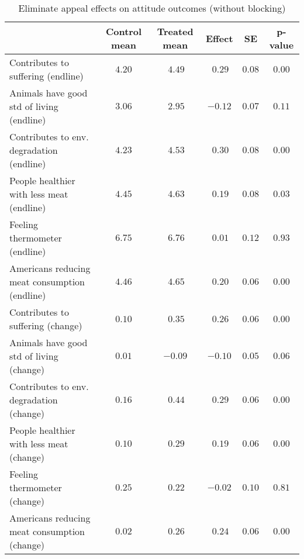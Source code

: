 \begin{table*}[ht]
\caption{Eliminate appeal effects on attitude outcomes (without blocking)\label{round}} 
\begin{center}
\begin{tabular}{lccccc}
\hline\hline
\multicolumn{1}{l}{}&\multicolumn{1}{c}{Control mean}&\multicolumn{1}{c}{Treated mean}&\multicolumn{1}{c}{Effect}&\multicolumn{1}{c}{SE}&\multicolumn{1}{c}{p-value}\tabularnewline
\hline
Contributes to suffering (endline)&$4.20$&$~4.49$&$~0.29$&$0.08$&$0.00$\tabularnewline
Animals have good std of living (endline)&$3.06$&$~2.95$&$-0.12$&$0.07$&$0.11$\tabularnewline
Contributes to env. degradation (endline)&$4.23$&$~4.53$&$~0.30$&$0.08$&$0.00$\tabularnewline
People healthier with less meat (endline)&$4.45$&$~4.63$&$~0.19$&$0.08$&$0.03$\tabularnewline
Feeling thermometer (endline)&$6.75$&$~6.76$&$~0.01$&$0.12$&$0.93$\tabularnewline
Americans reducing meat consumption (endline)&$4.46$&$~4.65$&$~0.20$&$0.06$&$0.00$\tabularnewline
Contributes to suffering (change)&$0.10$&$~0.35$&$~0.26$&$0.06$&$0.00$\tabularnewline
Animals have good std of living (change)&$0.01$&$-0.09$&$-0.10$&$0.05$&$0.06$\tabularnewline
Contributes to env. degradation (change)&$0.16$&$~0.44$&$~0.29$&$0.06$&$0.00$\tabularnewline
People healthier with less meat (change)&$0.10$&$~0.29$&$~0.19$&$0.06$&$0.00$\tabularnewline
Feeling thermometer (change)&$0.25$&$~0.22$&$-0.02$&$0.10$&$0.81$\tabularnewline
Americans reducing meat consumption (change)&$0.02$&$~0.26$&$~0.24$&$0.06$&$0.00$\tabularnewline
\hline
\end{tabular}\end{center}

\end{table*}
